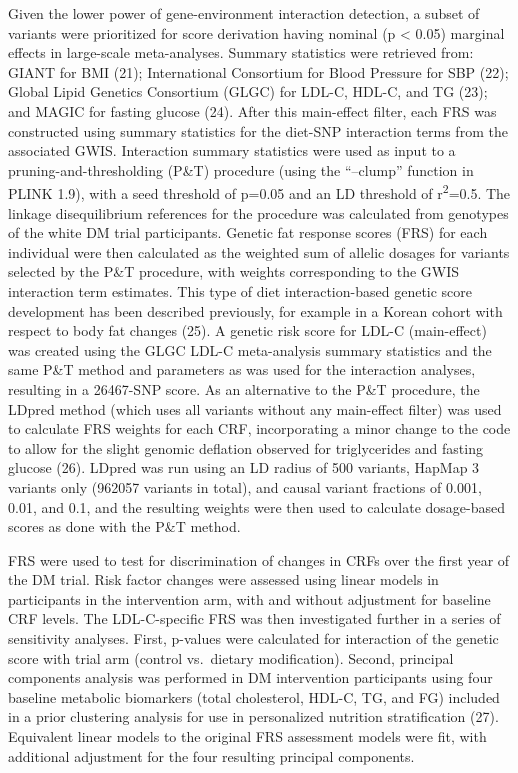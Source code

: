 \documentclass[]{article}
\begin{document}
Given the lower power of gene-environment interaction detection, a
subset of variants were prioritized for score derivation having nominal
(p \textless{} 0.05) marginal effects in large-scale meta-analyses.
Summary statistics were retrieved from: GIANT for BMI (21);
International Consortium for Blood Pressure for SBP (22); Global Lipid
Genetics Consortium (GLGC) for LDL-C, HDL-C, and TG (23); and MAGIC for
fasting glucose (24). After this main-effect filter, each FRS was
constructed using summary statistics for the diet-SNP interaction terms
from the associated GWIS. Interaction summary statistics were used as
input to a pruning-and-thresholding (P\&T) procedure (using the
``--clump'' function in PLINK 1.9), with a seed threshold of p=0.05 and
an LD threshold of r\textsuperscript{2}=0.5. The linkage disequilibrium
references for the procedure was calculated from genotypes of the white
DM trial participants. Genetic fat response scores (FRS) for each
individual were then calculated as the weighted sum of allelic dosages
for variants selected by the P\&T procedure, with weights corresponding
to the GWIS interaction term estimates. This type of diet
interaction-based genetic score development has been described
previously, for example in a Korean cohort with respect to body fat
changes (25). A genetic risk score for LDL-C (main-effect) was created
using the GLGC LDL-C meta-analysis summary statistics and the same P\&T
method and parameters as was used for the interaction analyses,
resulting in a 26467-SNP score. As an alternative to the P\&T procedure,
the LDpred method (which uses all variants without any main-effect
filter) was used to calculate FRS weights for each CRF, incorporating a
minor change to the code to allow for the slight genomic deflation
observed for triglycerides and fasting glucose (26). LDpred was run
using an LD radius of 500 variants, HapMap 3 variants only (962057
variants in total), and causal variant fractions of 0.001, 0.01, and
0.1, and the resulting weights were then used to calculate dosage-based
scores as done with the P\&T method.

FRS were used to test for discrimination of changes in CRFs over the
first year of the DM trial. Risk factor changes were assessed using
linear models in participants in the intervention arm, with and without
adjustment for baseline CRF levels. The LDL-C-specific FRS was then
investigated further in a series of sensitivity analyses. First,
p-values were calculated for interaction of the genetic score with trial
arm (control vs.~dietary modification). Second, principal components
analysis was performed in DM intervention participants using four
baseline metabolic biomarkers (total cholesterol, HDL-C, TG, and FG)
included in a prior clustering analysis for use in personalized
nutrition stratification (27). Equivalent linear models to the original
FRS assessment models were fit, with additional adjustment for the four
resulting principal components.
\end{document}
